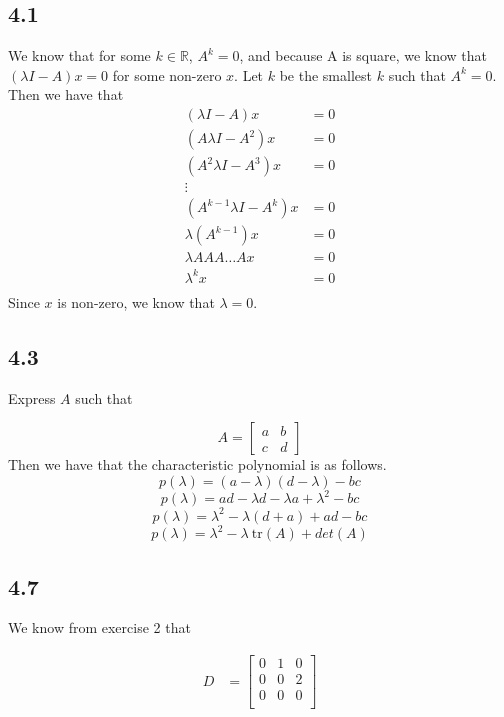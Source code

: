 \documentclass[letterpaper,12pt]{article}
\theoremstyle{definition}
\begin{document}
\subsection*{4.1}
We know that for some $k \in \mathbb{R}$, $A^k = 0$, and because A is square, we know that $(\lambda I - A)x = 0$ for some non-zero $x$. Let $k$ be the smallest $k$ such that $A^k = 0$. Then we have that
\begin{align*}
    (\lambda I - A)x &= 0\\
    (A\lambda I - A^2)x &= 0\\
    (A^2\lambda I - A^3)x &= 0\\
    \vdots\\
    (A^{k-1}\lambda I - A^k)  x &= 0\\
    \lambda (A^{k-1}) x &= 0\\
    \lambda AAA \dots Ax &= 0\\
    \lambda^k x &= 0\\
\end{align*}
Since $x$ is non-zero, we know that $\lambda=0$.

\subsection*{4.3}

Express $A$ such that 

\[A =
\begin{bmatrix}
    a & b\\
    c & d
\end{bmatrix}\]
Then we have that the characteristic polynomial is as follows.
\[p(\lambda) = (a-\lambda)(d-\lambda) - bc\]
\[p(\lambda) = ad - \lambda d - \lambda a + \lambda^2 - bc\]
\[p(\lambda) = \lambda^2 - \lambda (d + a)+ ad - bc \]
\[p(\lambda) = \lambda^2 - \lambda ~\textrm{tr}(A) + det(A) \]


\subsection*{4.7}

We know from exercise 2 that

\begin{align*}
    D &= 
\begin{bmatrix}
    0 & 1 & 0\\
    0 & 0 & 2\\
    0 & 0 & 0\\
\end{bmatrix}
\end{align*}
\end{document}
